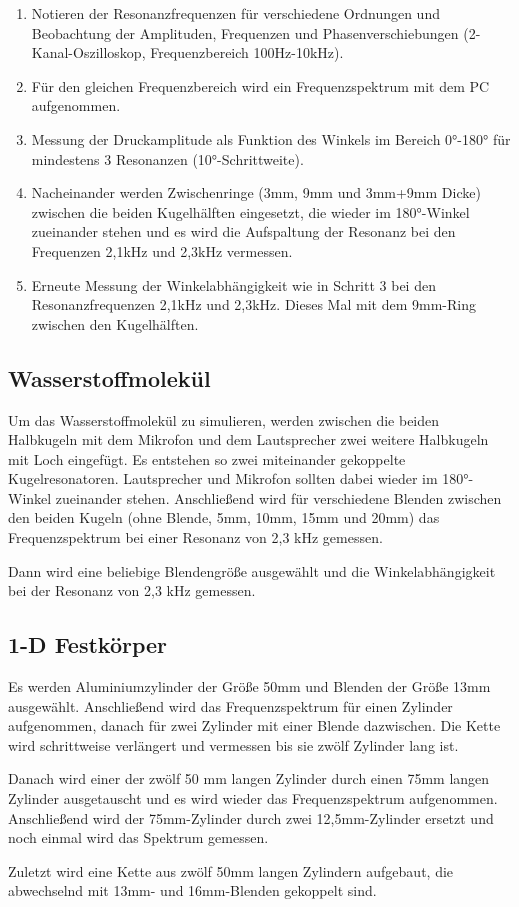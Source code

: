 \begin{enumerate}
\item Notieren der Resonanzfrequenzen für verschiedene Ordnungen und Beobachtung der Amplituden, Frequenzen und
Phasenverschiebungen (2-Kanal-Oszilloskop, Frequenzbereich 100Hz-10kHz).
\item Für den gleichen Frequenzbereich wird ein Frequenzspektrum mit dem PC aufgenommen.
\item Messung der Druckamplitude als Funktion des Winkels im Bereich 0°-180° für mindestens 3 Resonanzen (10°-Schrittweite).
\item Nacheinander werden Zwischenringe (3mm, 9mm und 3mm+9mm Dicke) zwischen die beiden Kugelhälften eingesetzt, die wieder im
180°-Winkel zueinander stehen und es wird die Aufspaltung der Resonanz bei den Frequenzen 2,1kHz und 2,3kHz vermessen.
\item Erneute Messung der Winkelabhängigkeit wie in Schritt 3 bei den Resonanzfrequenzen 2,1kHz und 2,3kHz. Dieses Mal mit
dem 9mm-Ring zwischen den Kugelhälften.
\end{enumerate}

\subsection{Wasserstoffmolekül}

Um das Wasserstoffmolekül zu simulieren, werden zwischen die beiden Halbkugeln mit dem Mikrofon und dem Lautsprecher zwei
weitere Halbkugeln mit Loch eingefügt. Es entstehen so zwei miteinander gekoppelte Kugelresonatoren. Lautsprecher und Mikrofon
sollten dabei wieder im 180°-Winkel zueinander stehen. Anschließend wird für verschiedene Blenden zwischen den beiden Kugeln
(ohne Blende, 5mm, 10mm, 15mm und 20mm) das Frequenzspektrum bei einer Resonanz von 2,3 kHz gemessen.

Dann wird eine beliebige Blendengröße ausgewählt und die Winkelabhängigkeit bei der Resonanz von 2,3 kHz gemessen.

\subsection{1-D Festkörper}

Es werden Aluminiumzylinder der Größe 50mm und Blenden der Größe 13mm ausgewählt. Anschließend wird das Frequenzspektrum für
einen Zylinder aufgenommen, danach für zwei Zylinder mit einer Blende dazwischen. Die Kette wird schrittweise verlängert
und vermessen bis sie zwölf Zylinder lang ist.

Danach wird einer der zwölf 50 mm langen Zylinder durch einen 75mm langen Zylinder ausgetauscht und es wird wieder das
Frequenzspektrum aufgenommen. Anschließend wird der 75mm-Zylinder durch zwei 12,5mm-Zylinder ersetzt und noch einmal wird das
Spektrum gemessen.

Zuletzt wird eine Kette aus zwölf 50mm langen Zylindern aufgebaut, die abwechselnd mit 13mm- und 16mm-Blenden gekoppelt sind.
